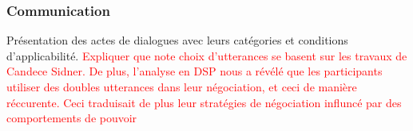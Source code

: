 \subsubsection{Communication}

Présentation des actes de dialogues avec leurs catégories et conditions d'applicabilité. 
\textcolor{red}{Expliquer que note choix d'utterances se basent sur les travaux de Candece Sidner. De plus, l'analyse en DSP nous a révélé que les participants utiliser des doubles utterances dans leur négociation, et ceci de manière réccurente. Ceci traduisait de plus leur stratégies de négociation influncé par des comportements de pouvoir}

